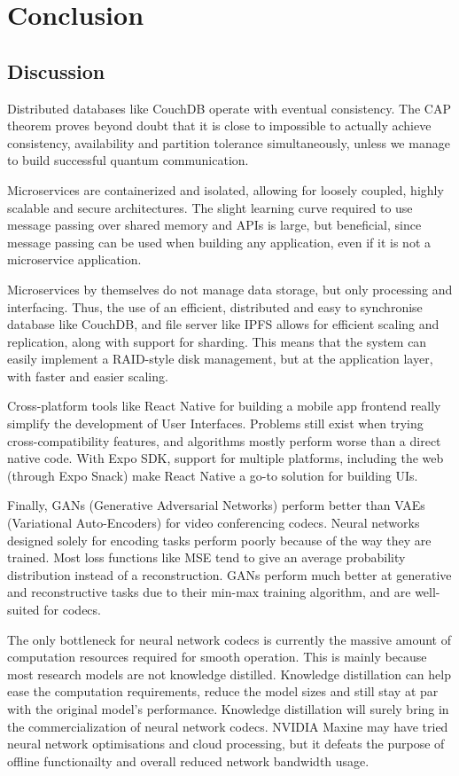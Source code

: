 \chapter{\centering Conclusion}

\section{Discussion}
Distributed databases like CouchDB operate with eventual consistency. The CAP theorem proves beyond doubt that it is close to impossible 
to actually achieve consistency, availability and partition tolerance simultaneously, unless we manage to build successful quantum communication.

Microservices are containerized and isolated, allowing for loosely coupled, highly scalable and secure architectures. The slight learning curve required 
to use message passing over shared memory and APIs is large, but beneficial, since message passing can be used when building any application, even if it is 
not a microservice application.

Microservices by themselves do not manage data storage, but only processing and interfacing. Thus, the use of an efficient, distributed and easy 
to synchronise database like CouchDB, and file server like IPFS allows for efficient scaling and replication, along with support for sharding. This means that the system can 
easily implement a RAID-style disk management, but at the application layer, with faster and easier scaling.

Cross-platform tools like React Native for building a mobile app frontend really simplify the development of User Interfaces. Problems still exist when 
trying cross-compatibility features, and algorithms mostly perform worse than a direct native code. With Expo SDK, support for multiple platforms, including 
the web (through Expo Snack) make React Native a go-to solution for building UIs.

Finally, GANs (Generative Adversarial Networks) perform better than VAEs (Variational Auto-Encoders) for video conferencing codecs. 
Neural networks designed solely for encoding tasks perform poorly because of the way they are trained. Most loss functions like MSE tend to give an average probability 
distribution instead of a reconstruction. GANs perform much better at generative and reconstructive tasks due to their min-max training algorithm, and are well-suited for codecs.

The only bottleneck for neural network codecs is currently the massive amount of computation resources required for smooth operation. This is mainly because 
most research models are not knowledge distilled. Knowledge distillation can help ease the computation requirements, reduce the model sizes and still stay at 
par with the original model's performance. Knowledge distillation will surely bring in the commercialization of neural network codecs. NVIDIA Maxine may have tried neural 
network optimisations and cloud processing, but it defeats the purpose of offline functionailty and overall reduced network bandwidth usage.

